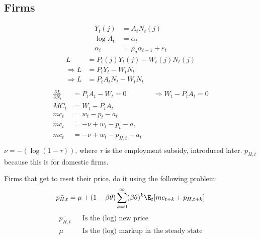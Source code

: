 \subsection{Firms}
\begin{align}
    Y_t(j)   & = A_t N_t(j)                          \\
    \log A_t & = \alpha_t                            \\
    \alpha_t & = \rho_a \alpha_{t-1} + \varepsilon_t
\end{align}
\begin{align}
    L             & =P_{t}(j)Y_{t}(j) - W_t(j)N_{t}(j) \\
    \Rightarrow L & =P_{t}Y_{t} - W_tN_{t}             \\
    \Rightarrow L & =P_{t}A_t N_t - W_tN_{t}           \\
\end{align}
\begin{align}
    \frac{\partial L}{\partial N_t} & = P_t A_t - W_t = 0          &  & \Rightarrow W_t - P_tA_t = 0 \\
    MC_t                            & = W_t - P_tA_t                                                 \\
    mc_t                            & = w_t - p_t - a_t                                              \\
    mc_t                            & = -\nu + w_t - p_t - a_t                                       \\
    mc_t                            & = -\nu + w_t - p_{H,t} - a_t                                   \\
\end{align}
$\nu=-(\log (1-\tau))$, where $\tau$ is the employment subsidy, introduced later. $p_{H,t}$ because this is for domestic firms.

Firms that get to reset their price, do it using the following problem:
\begin{equation}
    \bar{p_{H,t}} = \mu + (1-\beta \theta) \sum_{k=0}^{\infty} (\beta \theta)^{k} \E_t [mc_{t+k} + p_{H,t+k}]
\end{equation}
\begin{align}
    \bar{p_{H,t}} &  & \text{Is the (log) new price}                  \\
    \mu           &  & \text{Is the (log) markup in the steady state}
\end{align}
